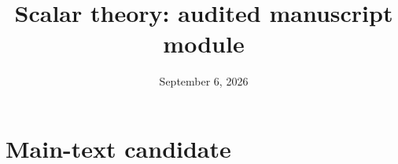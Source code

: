 \documentclass[11pt]{article}
\title{Scalar theory: audited manuscript module}
\author{}
\date{September 6, 2026}
\begin{document}
\maketitle
\section{Main-text candidate}

\appendix



\end{document}
